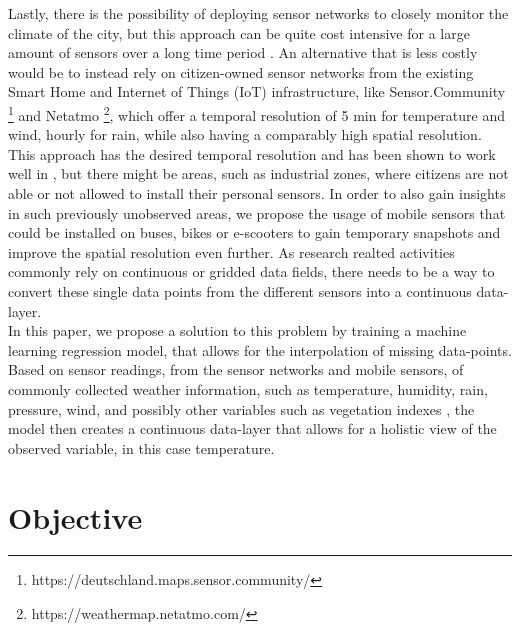 Lastly, there is the possibility of deploying sensor networks to closely monitor the climate of the city, but this approach can be quite cost intensive for a large amount of sensors over a long time period \cite{chapman2015birmingham}. An alternative that is less costly would be to instead rely on citizen-owned sensor networks from the existing Smart Home and Internet of Things (IoT) infrastructure, like Sensor.Community \footnote{https://deutschland.maps.sensor.community/} and Netatmo \footnote{https://weathermap.netatmo.com/}, which offer a temporal resolution of 5 min for temperature and wind, hourly for rain, while also having a comparably high spatial resolution. This approach has the desired temporal resolution and has been shown to work well in \cite{meier2017crowdsourcing}, but there might be areas, such as industrial zones, where citizens are not able or not allowed to install their personal sensors. In order to also gain insights in such previously unobserved areas, we propose the usage of mobile sensors that could be installed on buses, bikes or e-scooters to gain temporary snapshots and improve the spatial resolution even further.
As research realted activities commonly rely on continuous or gridded data fields, there needs to be a way to convert these single data points from the different sensors into a continuous data-layer.\\
In this paper, we propose a solution to this problem by training a machine learning regression model, that allows for the interpolation of missing data-points. Based on sensor readings, from the sensor networks and mobile sensors, of commonly collected weather information, such as temperature, humidity, rain, pressure, wind, and possibly other variables such as vegetation indexes \cite{alonso2020new}, the model then creates a continuous data-layer that allows for a holistic view of the observed variable, in this case temperature.\\


\section{Objective}

